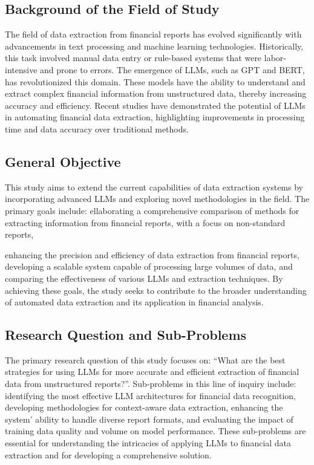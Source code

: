 \documentclass[english, 12pt, a4paper, elec, utf8, a-2b, online]{aaltothesis}
\begin{document}
\subsection{Background of the Field of Study}

The field of data extraction from financial reports has evolved significantly with advancements in text processing and machine learning technologies. Historically, this task involved manual data entry or rule-based systems that were labor-intensive and prone to errors. The emergence of \ac{LLM}s, such as \ac{GPT} and \ac{BERT}, has revolutionized this domain. These models have the ability to understand and extract complex financial information from unstructured data, thereby increasing accuracy and efficiency. Recent studies have demonstrated the potential of \ac{LLM}s in automating financial data extraction, highlighting improvements in processing time and data accuracy over traditional methods.

\subsection{General Objective}

This study aims to extend the current capabilities of data extraction systems by incorporating advanced \ac{LLM}s and exploring novel methodologies in the field.
The primary goals include: ellaborating a comprehensive comparison of methods for extracting information from financial reports, with a focus on non-standard reports,

enhancing the precision and efficiency of data extraction from financial reports, developing a scalable system capable of processing large volumes of data, and comparing the effectiveness of various \ac{LLM}s and extraction techniques. By achieving these goals, the study seeks to contribute to the broader understanding of automated data extraction and its application in financial analysis.

\subsection{Research Question and Sub-Problems}

The primary research question of this study focuses on: ``What are the best strategies for using \ac{LLM}s for more accurate and efficient extraction of financial data from unstructured reports?''.
Sub-problems in this line of inquiry include: identifying the most effective LLM architectures for financial data recognition, developing methodologies for context-aware data extraction, enhancing the system’ ability to handle diverse report formats, and evaluating the impact of training data quality and volume on model performance.
These sub-problems are essential for understanding the intricacies of applying \ac{LLM}s to financial data extraction and for developing a comprehensive solution.
\end{document}
